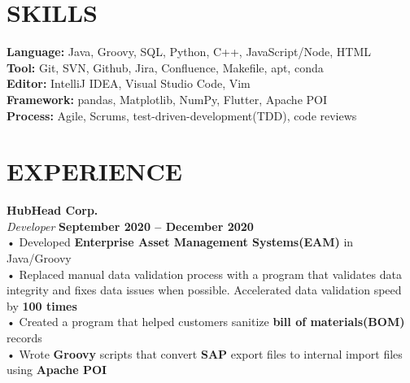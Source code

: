 \documentclass[margin,line]{resume}
\begin{document}
\begin{resume}
    \section{\mysidestyle \textbf{\large{S}\small{KILLS}}}

    \textbf{Language:} Java, Groovy, SQL, Python, C++, JavaScript/Node, HTML\\
    \textbf{Tool:} Git, SVN, Github, Jira, Confluence, Makefile, apt, conda \\
    \textbf{Editor:} IntelliJ IDEA, Visual Studio Code, Vim \\
    \textbf{Framework:} pandas, Matplotlib, NumPy, Flutter, Apache POI\\
    \textbf{Process:} Agile, Scrums, test-driven-development(TDD), code reviews
    \vspace{-1mm}

\sectionline

    \section{\mysidestyle \textbf{\large{E}\small{XPERIENCE}}}

    \textbf{\listing HubHead Corp.} \vspace{2mm}\\\vspace{1mm}%
    \textsl{Developer} \hfill \textbf{September 2020 -- December 2020}\\
    • Developed \textbf{Enterprise Asset Management Systems(EAM)} in Java/Groovy\\
    • Replaced manual data validation process with a program that validates data integrity and fixes
    data issues when possible.
    Accelerated data validation speed by \textbf{100 times}\\
    • Created a program that helped customers sanitize \textbf{bill of materials(BOM)} records\\
    • Wrote \textbf{Groovy} scripts that convert \textbf{SAP} export files to internal import files using \textbf{Apache POI}
    \vspace{-1mm}


\end{resume}
\end{document}
